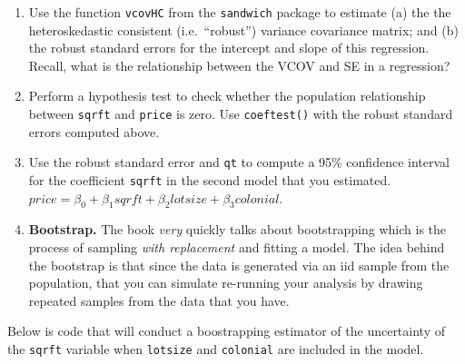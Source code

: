 \documentclass[
]{book}
\theoremstyle{definition}
\theoremstyle{definition}
\theoremstyle{definition}
\theoremstyle{definition}
\theoremstyle{remark}
\begin{document}
\begin{enumerate}
\def\labelenumi{\arabic{enumi}.}
\setcounter{enumi}{1}
\item
  Use the function \texttt{vcovHC} from the \texttt{sandwich} package to estimate (a) the the heteroskedastic consistent (i.e.~``robust'') variance covariance matrix; and (b) the robust standard errors for the intercept and slope of this regression. Recall, what is the relationship between the VCOV and SE in a regression?
\item
  Perform a hypothesis test to check whether the population relationship between \texttt{sqrft} and \texttt{price} is zero. Use \texttt{coeftest()} with the robust standard errors computed above.
\item
  Use the robust standard error and \texttt{qt} to compute a 95\% confidence interval for the coefficient \texttt{sqrft} in the second model that you estimated. \(price = \beta_{0} + \beta_{1} sqrft + \beta_{2} lotsize + \beta_{3} colonial\).
\item
  \textbf{Bootstrap.} The book \emph{very} quickly talks about bootstrapping which is the process of sampling \emph{with replacement} and fitting a model. The idea behind the bootstrap is that since the data is generated via an iid sample from the population, that you can simulate re-running your analysis by drawing repeated samples from the data that you have.
\end{enumerate}

Below is code that will conduct a boostrapping estimator of the uncertainty of the \texttt{sqrft} variable when \texttt{lotsize} and \texttt{colonial} are included in the model.
\end{document}
